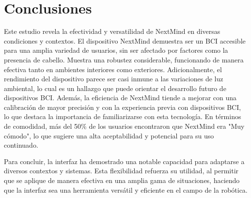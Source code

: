\section{Conclusiones}

Este estudio revela la efectividad y versatilidad de NextMind en diversas condiciones y contextos. El dispositivo NextMind demuestra ser un BCI accesible para una amplia variedad de usuarios, sin ser afectado por factores como la presencia de cabello. Muestra una robustez considerable, funcionando de manera efectiva tanto en ambientes interiores como exteriores. Adicionalmente, el rendimiento del dispositivo parece ser casi inmune a las variaciones de luz ambiental, lo cual es un hallazgo que puede orientar el desarrollo futuro de dispositivos BCI. Además, la eficiencia de NextMind tiende a mejorar con una calibración de mayor precisión y con la experiencia previa con dispositivos BCI, lo que destaca la importancia de familiarizarse con esta tecnología. En términos de comodidad, más del 50\% de los usuarios encontraron que NextMind era "Muy cómodo", lo que sugiere una alta aceptabilidad y potencial para su uso continuado.



Para concluir, la interfaz ha demostrado una notable capacidad para adaptarse a diversos contextos y sistemas. Esta flexibilidad refuerza su utilidad, al permitir que se aplique de manera efectiva en una amplia gama de situaciones, haciendo que la interfaz sea una herramienta versátil y eficiente en el campo de la robótica.

